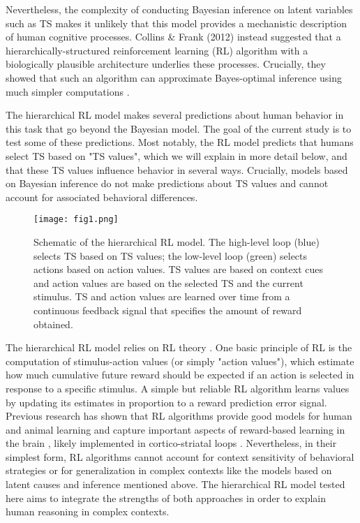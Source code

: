 \documentclass[10pt, letterpaper]{article}
\begin{document}
Nevertheless, the complexity of conducting Bayesian inference on latent variables such as TS makes it unlikely that this model provides a mechanistic description of human cognitive processes. Collins \& Frank (2012) instead suggested that a hierarchically-structured reinforcement learning (RL) algorithm with a biologically plausible architecture underlies these processes. Crucially, they showed that such an algorithm can approximate Bayes-optimal inference using much simpler computations \cite{collins_cognitive_2013}.

The hierarchical RL model makes several predictions about human behavior in this task that go beyond the Bayesian model. The goal of the current study is to test some of these predictions. Most notably, the RL model predicts that humans select TS based on "TS values", which we will explain in more detail below, and that these TS values influence behavior in several ways. Crucially, models based on Bayesian inference do not make predictions about TS values and cannot account for associated behavioral differences. 

\begin{figure}[ht]
    \begin{center}
	\texttt{[image: fig1.png]}
    \end{center}
    \caption{Schematic of the hierarchical RL model. The high-level loop (blue) selects TS based on TS values; the low-level loop (green) selects actions based on action values. TS values are based on context cues and action values are based on the selected TS and the current stimulus. TS and action values are learned over time from a continuous feedback signal that specifies the amount of reward obtained.} 
    \label{figure:2loops}
\end{figure}

The hierarchical RL model relies on RL theory \cite{sutton_reinforcement_2017}. One basic principle of RL is the computation of stimulus-action values (or simply "action values"), which estimate how much cumulative future reward should be expected if an action is selected in response to a specific stimulus. A simple but reliable RL algorithm learns values by updating its estimates in proportion to a reward prediction error signal. Previous research has shown that RL algorithms provide good models for human and animal learning \cite{daw_model-based_2011} and capture important aspects of reward-based learning in the brain \cite{schultz_neural_1997}, likely implemented in cortico-striatal loops \cite{alexander_parallel_1986}. Nevertheless, in their simplest form, RL algorithms cannot account for context sensitivity of behavioral strategies or for generalization in complex contexts like the models based on latent causes and inference mentioned above. The hierarchical RL model tested here aims to integrate the strengths of both approaches in order to explain human reasoning in complex contexts.
\end{document}
